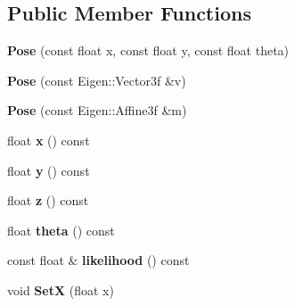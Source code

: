 \subsection*{Public Member Functions}
\begin{DoxyCompactItemize}
\item 
\mbox{\label{classdepth__clustering_1_1Pose_a776425156ff6d177a3f74bb81b322e34}} 
{\bfseries Pose} (const float x, const float y, const float theta)
\item 
\mbox{\label{classdepth__clustering_1_1Pose_a667cea1e30e54fbe31ff2386d3704184}} 
{\bfseries Pose} (const Eigen\+::\+Vector3f \&v)
\item 
\mbox{\label{classdepth__clustering_1_1Pose_ac40f03706f9d27f14f64aabc49f947c9}} 
{\bfseries Pose} (const Eigen\+::\+Affine3f \&m)
\item 
\mbox{\label{classdepth__clustering_1_1Pose_a4c5bfdddd3c29efa9b44745f67ab40ea}} 
float {\bfseries x} () const
\item 
\mbox{\label{classdepth__clustering_1_1Pose_a969aced7b080a6e4a69ce6e030585b48}} 
float {\bfseries y} () const
\item 
\mbox{\label{classdepth__clustering_1_1Pose_ac8c15182041910fabce5e17f3c2118ba}} 
float {\bfseries z} () const
\item 
\mbox{\label{classdepth__clustering_1_1Pose_a47059ac31a81049047b2fdc7e9ece664}} 
float {\bfseries theta} () const
\item 
\mbox{\label{classdepth__clustering_1_1Pose_a809c213da1f2c51fde0a07f283f3c892}} 
const float \& {\bfseries likelihood} () const
\item 
\mbox{\label{classdepth__clustering_1_1Pose_a46a6316ba2b6fa0dca276ac60893d2ba}} 
void {\bfseries SetX} (float x)
\item 
\mbox{\label{classdepth__clustering_1_1Pose_aa3931408c4e3da517c50cbbde67c8766}} 

\end{DoxyCompactItemize}
